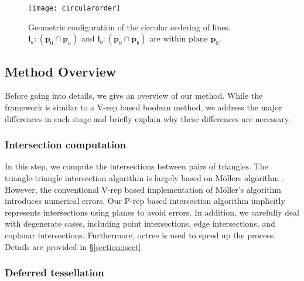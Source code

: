 \begin{figure}[t]
\centering
\texttt{[image: circularorder]}
\caption{Geometric configuration of the circular ordering of lines. $\bm{l}_a\colon(\bm{p}_0 \cap \bm{p}_a)$ and $\bm{l}_b\colon(\bm{p}_0 \cap \bm{p}_b)$ are within plane $\bm{p}_0$.}
\label{fig:circularorder}
\end{figure}

\subsection{Method Overview}



Before going into details, we give an overview of our method. While the framework is similar to a V-rep based boolean method, we address the major differences in each stage and briefly explain why these differences are necessary.

\subsubsection{Intersection computation}

In this step, we compute the intersections between pairs of triangles. The triangle-triangle intersection algorithm is largely based on M\"{o}llers algorithm \cite{moller1997fast}. However, the conventional V-rep based implementation of M\"{o}ller's algorithm introduces numerical errors. Our P-rep based intersection algorithm implicitly represents intersections using planes to avoid errors. In addition, we carefully deal with degenerate cases, including point intersections, edge intersections, and coplanar intersections. Furthermore, octree is used to speed up the process. Details are provided in \S\ref{section:isect}.

\subsubsection{Deferred tessellation}


